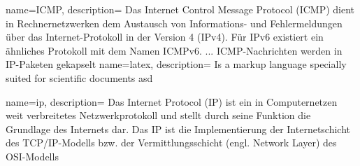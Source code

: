 \makeglossaries
{}
{
	name=ICMP,
	description={
		Das Internet Control Message Protocol (ICMP) dient in Rechnernetzwerken dem Austausch von Informations- und Fehlermeldungen über das Internet-Protokoll in der Version 4 (IPv4). Für IPv6 existiert ein ähnliches Protokoll mit dem Namen ICMPv6. ... ICMP-Nachrichten werden in IP-Paketen gekapselt}
}
{
	name=latex,
	description={
		Is a markup language specially suited 
		for scientific documents asd}
}

{
	name=ip,
	description={
		Das Internet Protocol (IP) ist ein in Computernetzen weit verbreitetes Netzwerkprotokoll und stellt durch seine Funktion die Grundlage des Internets dar. Das IP ist die Implementierung der Internetschicht des TCP/IP-Modells bzw. der Vermittlungsschicht (engl. Network Layer) des OSI-Modells}
}